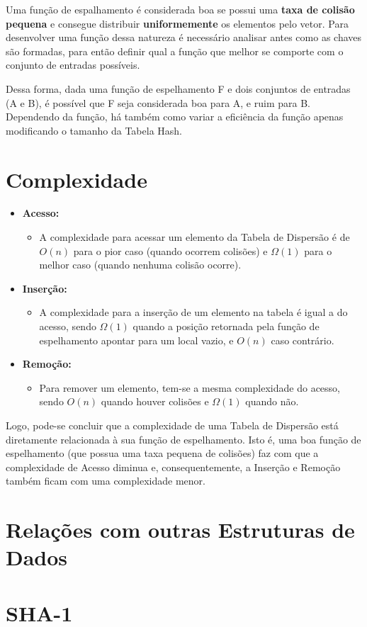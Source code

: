 \documentclass[12pt,openright,oneside,a4paper,english,brazil]{abntex2}
\begin{document}
    Uma função de espalhamento é considerada boa se possui uma \textbf{taxa de colisão pequena} e consegue distribuir \textbf{uniformemente} os elementos pelo vetor.
    Para desenvolver uma função dessa natureza é necessário analisar antes como as chaves são formadas, para então definir qual a função que melhor se comporte com o conjunto de entradas possíveis.

    Dessa forma, dada uma função de espelhamento F e dois conjuntos de entradas (A e B), é possível que F seja considerada boa para A, e ruim para B.
    Dependendo da função, há também como variar a eficiência da função apenas modificando o tamanho da Tabela Hash.

\section*{Complexidade}
    \begin{itemize}
        \item \textbf{Acesso:}
        \begin{itemize}[label={}]
            \item A complexidade para acessar um elemento da Tabela de Dispersão é de $O(n)$ para o pior caso (quando ocorrem colisões) e $\Omega(1)$ para o melhor caso (quando nenhuma colisão ocorre).
        \end{itemize}
        \item \textbf{Inserção:}
        \begin{itemize}[label={}]
            \item A complexidade para a inserção de um elemento na tabela é igual a do acesso, sendo $\Omega(1)$ quando a posição retornada pela função de espelhamento apontar para um local vazio, e $O(n)$ caso contrário.
        \end{itemize}
        \item \textbf{Remoção:}
        \begin{itemize}[label={}]
            \item Para remover um elemento, tem-se a mesma complexidade do acesso, sendo $O(n)$ quando houver colisões e $\Omega(1)$ quando não.
        \end{itemize}
    \end{itemize}

    Logo, pode-se concluir que a complexidade de uma Tabela de Dispersão está diretamente relacionada à sua função de espelhamento. Isto é, uma boa função de espelhamento (que possua uma taxa pequena de colisões) faz com que a complexidade de Acesso diminua e, consequentemente, a Inserção e Remoção também ficam com uma complexidade menor.

\section*{Relações com outras Estruturas de Dados}

\section*{SHA-1}
\end{document}
